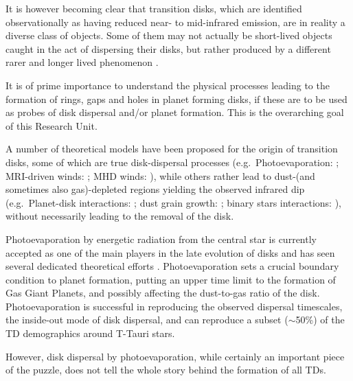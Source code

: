 \documentclass[10pt,fleqn,twoside]{article}
\begin{document}
It is however becoming clear that transition disks, which are
identified observationally as having reduced near- to mid-infrared
emission,  are in reality a diverse class of objects. Some of them may
not actually be short-lived objects caught in the act of dispersing
their disks, but rather produced by a different rarer and longer lived
phenomenon 
\citep[see e.g.,][]{2016PASA...33....5O, 2016ApJ...825...77D}.
\begin{highlight}
It is of prime
importance to understand the physical processes leading to the
formation of rings, gaps and holes in planet forming disks, if these are to
be used as probes of disk dispersal and/or planet formation. This is
the overarching goal of this Research Unit. 
\end{highlight}

A number of theoretical models have been proposed for the origin of
transition disks, some of which are true disk-dispersal processes
(e.g.\ Photoevaporation: \citep{2001MNRAS.328..485C}; MRI-driven
winds: \citep{2009ApJ...691L..49S}; MHD winds: \citep{2016ApJ...821...80B}), 
while others
rather lead to dust-(and sometimes also gas)-depleted regions yielding
the observed infrared dip (e.g.\ Planet-disk interactions: 
\citep{2005ApJ...630L.185C}; dust grain growth: \citep{2005A&A...434..971D}; 
binary stars interactions: \citep{1992ApJ...395L.115M}), without necessarily leading to
the removal of the disk.  

Photoevaporation by energetic radiation from the central star is currently accepted as one of
the main players in the late evolution of disks and has seen several
dedicated theoretical efforts 
\citep[e.g.,][]{2001MNRAS.328..485C, 2006MNRAS.369..216A, 2008ApJ...688..398E,
2009ApJ...699.1639E, 2010MNRAS.401.1415O, 2011MNRAS.412...13O, 2012MNRAS.422.1880O,
2009ApJ...690.1539G, 2009ApJ...705.1237G, 2015ApJ...804...29G}.
Photoevaporation sets a crucial boundary condition to planet formation, 
putting an upper time limit to the formation of Gas Giant Planets, and 
possibly affecting the dust-to-gas ratio of the disk.
Photoevaporation is
successful in reproducing the observed dispersal timescales, the
inside-out mode of disk dispersal, and can reproduce a subset
($\sim$50\%) of the TD demographics around T-Tauri stars.

However, disk dispersal by photoevaporation, while certainly an important piece of the
puzzle, does not tell the whole story behind the formation of all
TDs. 
\end{document}
